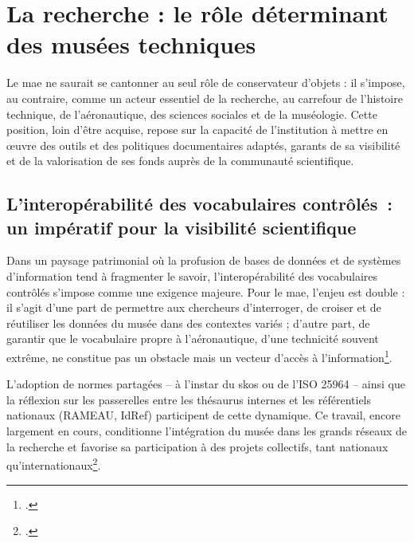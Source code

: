 \section{\label{I-A-2}La recherche : le rôle déterminant des musées techniques}


%
%
%


Le \ac{mae} ne saurait se cantonner au seul rôle de conservateur d’objets : il s’impose, au contraire, comme un acteur essentiel de la recherche, au carrefour de l’histoire technique, de l’aéronautique, des sciences sociales et de la muséologie. Cette position, loin d’être acquise, repose sur la capacité de l’institution à mettre en œuvre des outils et des politiques documentaires adaptés, garants de sa visibilité et de la valorisation de ses fonds auprès de la communauté scientifique.

\subsection{L’interopérabilité des vocabulaires contrôlés : un impératif pour la visibilité scientifique}

Dans un paysage patrimonial où la profusion de bases de données et de systèmes d’information tend à fragmenter le savoir, l’interopérabilité des vocabulaires contrôlés s’impose comme une exigence majeure. Pour le \ac{mae}, l’enjeu est double : il s’agit d’une part de permettre aux chercheurs d’interroger, de croiser et de réutiliser les données du musée dans des contextes variés ; d’autre part, de garantir que le vocabulaire propre à l’aéronautique, d’une technicité souvent extrême, ne constitue pas un obstacle mais un vecteur d’accès à l’information\footcite{hudonISO25964Pour2012a,chichereauNormesConceptionGestion2007}. 

L’adoption de normes partagées – à l’instar du \ac{skos} ou de l’ISO 25964 – ainsi que la réflexion sur les passerelles entre les thésaurus internes et les référentiels nationaux (RAMEAU, IdRef) participent de cette dynamique. Ce travail, encore largement en cours, conditionne l’intégration du musée dans les grands réseaux de la recherche et favorise sa participation à des projets collectifs, tant nationaux qu’internationaux\footcite{nouvelThesaurusPACTOLSSysteme2019}.

